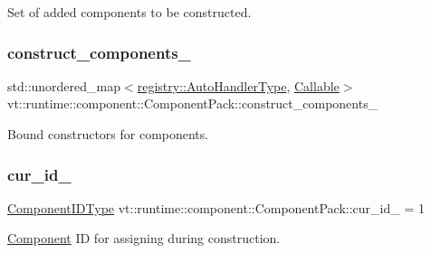 Set of added components to be constructed. 

\mbox{\label{structvt_1_1runtime_1_1component_1_1_component_pack_a94303b85754dae6c7442bdd3de41829f}} 
\subsubsection{\texorpdfstring{construct\+\_\+components\+\_\+}{construct\_components\_}}
{\footnotesize\ttfamily std\+::unordered\+\_\+map$<$\hyperlink{namespacevt_1_1runtime_1_1component_1_1registry_a9b86518797c7bb91babf0ca8ee7d06e6}{registry\+::\+Auto\+Handler\+Type}, \hyperlink{structvt_1_1runtime_1_1component_1_1_component_pack_aa4389ab338cdac3a8900a9e777c0d3c9}{Callable}$>$ vt\+::runtime\+::component\+::\+Component\+Pack\+::construct\+\_\+components\+\_\+\hspace{0.3cm}{\ttfamily [private]}}



Bound constructors for components. 

\mbox{\label{structvt_1_1runtime_1_1component_1_1_component_pack_a4163295f78b9dbd6e135783cf6d2ccce}} 
\subsubsection{\texorpdfstring{cur\+\_\+id\+\_\+}{cur\_id\_}}
{\footnotesize\ttfamily \hyperlink{namespacevt_ab6ac935c168b809c422d5121da4f2700}{Component\+I\+D\+Type} vt\+::runtime\+::component\+::\+Component\+Pack\+::cur\+\_\+id\+\_\+ = 1\hspace{0.3cm}{\ttfamily [private]}}



\hyperlink{structvt_1_1runtime_1_1component_1_1_component}{Component} ID for assigning during construction. 

